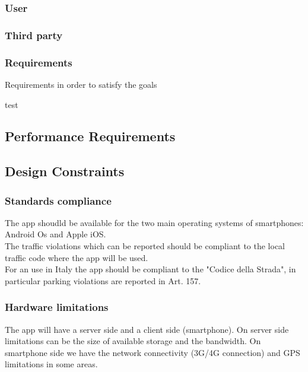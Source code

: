\begin{enumerate}
\begin{itemize}


\subsubsection{User}
\subsubsection{Third party}

\subsubsection{Requirements}
Requirements in order to satisfy the goals
\begin{enumerate}
   test
\end{enumerate}



\subsection{Performance Requirements}


\subsection{Design Constraints}%

\subsubsection{Standards compliance}
The app shoudld be available for the two main operating systems of smartphones: Android Os and Apple iOS.\\
The traffic violations which can be reported should be compliant to the local traffic code where the app will be used.\\
For an use in Italy the app should be compliant to the "Codice della Strada", in particular parking violations are reported in Art. 157.\\


\subsubsection{Hardware limitations}
The app will have a server side and a client side (smartphone).
On server side limitations can be the size of available storage and the bandwidth.
On smartphone side we have the network connectivity (3G/4G connection) and GPS limitations in some areas.


\end{itemize}
\end{enumerate}
